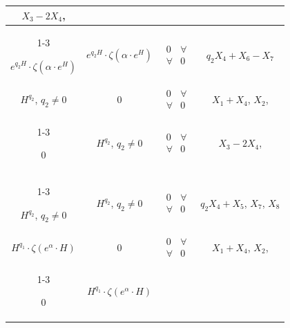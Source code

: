 \begin{center}
\begin{tabular}{|c|c|c|c|}
$X_3-2X_4$, \\


\cline{1-3}


$e^{q_2H}\cdot\zeta(\alpha\cdot e^H)$ &


$e^{q_2H}\cdot\zeta(\alpha\cdot e^H)$ &


$\begin{matrix} 0 & \forall \\ \forall & 0\end{matrix}$ &


$q_2X_4+X_6-X_7$ \\


\hline


%


$H^{q_2}$, $q_2\ne0$ & 0 &


$\begin{matrix} 0 & \forall \\ \forall & 0\end{matrix}$ &


$X_1+X_4$, $X_2$, \\


\cline{1-3}


0 & $H^{q_2}$, $q_2\ne0$ &


$\begin{matrix} 0 & \forall \\ \forall & 0\end{matrix}$ &


$X_3-2X_4$, \\


\cline{1-3}


$H^{q_2}$, $q_2\ne0$ & $H^{q_2}$, $q_2\ne0$ &


$\begin{matrix} 0 & \forall \\ \forall & 0\end{matrix}$ &


$q_2X_4+X_5$, $X_7$, $X_8$ \\


\hline


%


$H^{q_1}\cdot\zeta(e^\alpha\cdot H)$ & 0 &


$\begin{matrix} 0 & \forall \\ \forall & 0\end{matrix}$ &


$X_1+X_4$, $X_2$,\\


\cline{1-3}


0 & $H^{q_1}\cdot\zeta(e^\alpha\cdot H)$ &



\end{tabular}
\end{center}
